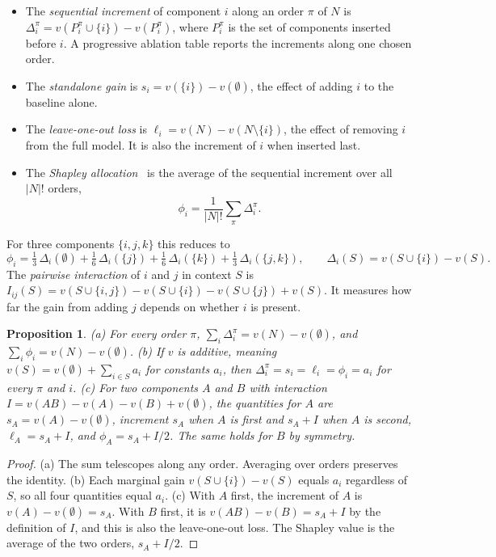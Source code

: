 \documentclass[11pt]{article}
\theoremstyle{plain}
\newtheorem{proposition}{Proposition}
\theoremstyle{remark}
\begin{document}
\begin{itemize}
\item The \emph{sequential increment} of component $i$ along an order $\pi$ of $N$ is $\Delta_i^\pi=v(P_i^\pi\cup\{i\})-v(P_i^\pi)$, where $P_i^\pi$ is the set of components inserted before $i$. A progressive ablation table reports the increments along one chosen order.
\item The \emph{standalone gain} is $s_i=v(\{i\})-v(\emptyset)$, the effect of adding $i$ to the baseline alone.
\item The \emph{leave-one-out loss} is $\ell_i=v(N)-v(N\setminus\{i\})$, the effect of removing $i$ from the full model. It is also the increment of $i$ when inserted last.
\item The \emph{Shapley allocation}~\cite{shapley1953} is the average of the sequential increment over all $|N|!$ orders,
\[
\phi_i=\frac{1}{|N|!}\sum_{\pi}\Delta_i^\pi .
\]
\end{itemize}
For three components $\{i,j,k\}$ this reduces to
\begin{equation}\label{eq:shap3}
\phi_i=\tfrac13\,\Delta_i(\emptyset)+\tfrac16\,\Delta_i(\{j\})+\tfrac16\,\Delta_i(\{k\})+\tfrac13\,\Delta_i(\{j,k\}),\qquad \Delta_i(S)=v(S\cup\{i\})-v(S).
\end{equation}
The \emph{pairwise interaction} of $i$ and $j$ in context $S$ is $I_{ij}(S)=v(S\cup\{i,j\})-v(S\cup\{i\})-v(S\cup\{j\})+v(S)$. It measures how far the gain from adding $j$ depends on whether $i$ is present.

\begin{proposition}\label{prop:facts}
(a) For every order $\pi$, $\sum_i\Delta_i^\pi=v(N)-v(\emptyset)$, and $\sum_i\phi_i=v(N)-v(\emptyset)$.
(b) If $v$ is additive, meaning $v(S)=v(\emptyset)+\sum_{i\in S}a_i$ for constants $a_i$, then $\Delta_i^\pi=s_i=\ell_i=\phi_i=a_i$ for every $\pi$ and $i$.
(c) For two components $A$ and $B$ with interaction $I=v(AB)-v(A)-v(B)+v(\emptyset)$, the quantities for $A$ are $s_A=v(A)-v(\emptyset)$, increment $s_A$ when $A$ is first and $s_A+I$ when $A$ is second, $\ell_A=s_A+I$, and $\phi_A=s_A+I/2$. The same holds for $B$ by symmetry.
\end{proposition}
\begin{proof}
(a) The sum telescopes along any order. Averaging over orders preserves the identity.
(b) Each marginal gain $v(S\cup\{i\})-v(S)$ equals $a_i$ regardless of $S$, so all four quantities equal $a_i$.
(c) With $A$ first, the increment of $A$ is $v(A)-v(\emptyset)=s_A$. With $B$ first, it is $v(AB)-v(B)=s_A+I$ by the definition of $I$, and this is also the leave-one-out loss. The Shapley value is the average of the two orders, $s_A+I/2$.
\end{proof}
\end{document}
